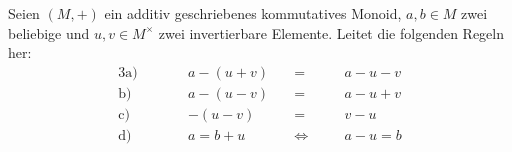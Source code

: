 \begin{aufg}
    Seien $(M,+)$ ein additiv geschriebenes kommutatives Monoid, $a,b\in M$ zwei beliebige und $u,v\in M^\times$ zwei invertierbare Elemente. Leitet die folgenden Regeln her:
    \begin{alignat*}{3}
        \text{a)}&\qquad & a-(u+v) & \quad=&\quad &a-u-v \\
        \text{b)}&\qquad & a-(u-v) & \quad=&\quad &a-u+v \\
        \text{c)}&\qquad & -(u-v) & \quad=&\quad &v-u \\
        \text{d)}&\qquad & a=b+u & \quad\Leftrightarrow&\quad &a-u=b
    \end{alignat*}
\end{aufg}


\begin{comment}
\begin{aufg}[Kürzbarkeit]
    Sei $(M,*)$ ein Monoid. Ein Element $a\in M$ heißt \textbf{kürzbar}, wenn „Multiplikation mit $a$“ eine Äquivalenzumformung ist, d.h. wenn für alle $x,y\in M$ die beiden Äquivalenzen
    \begin{align*}
        a*x& =a*y \quad \leftrightarrow\quad x=y\\
        \text{und}\qquad x*a& =y*a \quad \leftrightarrow\quad x=y
    \end{align*}
    gelten.
    \begin{enumerate}
        \item Beweist, dass jedes invertierbare Element kürzbar ist.
        \item Ist ein kürzbares Element auch immer invertierbar?
    \end{enumerate}
\end{aufg}
\end{comment}


